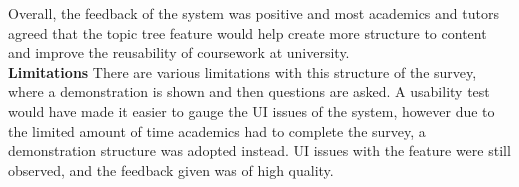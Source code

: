 Overall, the feedback of the system was positive and most academics and tutors agreed that the topic tree feature would help create more structure to content and improve the reusability of coursework at university.\\

\textbf{Limitations}
There are various limitations with this structure of the survey, where a demonstration is shown and then questions are asked. A usability test would have made it easier to gauge the UI issues of the system, however due to the limited amount of time academics had to complete the survey, a demonstration structure was adopted instead. UI issues with the feature were still observed, and the feedback given was of high quality.
